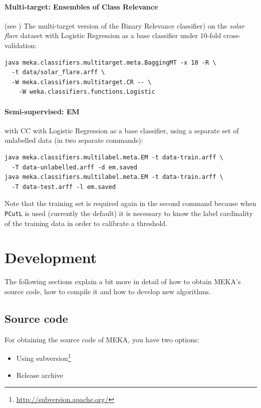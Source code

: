 \documentclass[11pt]{article}
\begin{document}
\paragraph{Multi-target: Ensembles of Class Relevance} (see \cite{UPM}) The multi-target version of the Binary Relevance classifier) on the \textit{solar flare} dataset with Logistic Regression as a base classifier under $10$-fold cross-validation:
\begin{lstlisting}
java meka.classifiers.multitarget.meta.BaggingMT -x 10 -R \
  -t data/solar_flare.arff \
  -W meka.classifiers.multitarget.CR -- \
    -W weka.classifiers.functions.Logistic
\end{lstlisting}
 
\paragraph{Semi-supervised: EM} with CC with Logistic Regression as a base classifier, using a separate set of unlabelled data (in two separate commands):
\begin{lstlisting}
java meka.classifiers.multilabel.meta.EM -t data-train.arff \
  -T data-unlabelled.arff -d em.saved
java meka.classifiers.multilabel.meta.EM -t data-train.arff \
  -T data-test.arff -l em.saved
\end{lstlisting}

{\green Note that the training set is required again in the second command because when \texttt{PCutL} is used (currently the default) it is necessary to know the label cardinality of the training data in order to calibrate a threshold.}

\section{Development}
\label{development}
The following sections explain a bit more in detail of how to obtain MEKA's source code, how to compile it and how to develop new algorithms.

\subsection{Source code}
\label{sourcecode}
For obtaining the source code of MEKA, you have two options:
\begin{itemize}
  \item Using subversion\footnote{\url{http://subversion.apache.org/}}
  \item Release archive
\end{itemize}
\end{document}
